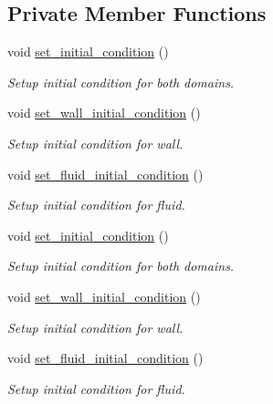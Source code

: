 \subsection*{Private Member Functions}
\begin{DoxyCompactItemize}
\item 
void \hyperlink{classFSIRingProblem_a309ea4c79fbae58020d94bf2c2318169}{set\+\_\+initial\+\_\+condition} ()
\begin{DoxyCompactList}\small\item\em Setup initial condition for both domains. \end{DoxyCompactList}\item 
void \hyperlink{classFSIRingProblem_a5f987c1b22dc306cf7d26be7fa74e322}{set\+\_\+wall\+\_\+initial\+\_\+condition} ()
\begin{DoxyCompactList}\small\item\em Setup initial condition for wall. \end{DoxyCompactList}\item 
void \hyperlink{classFSIRingProblem_ad397e4e3b92845240dd6a996856f33e7}{set\+\_\+fluid\+\_\+initial\+\_\+condition} ()
\begin{DoxyCompactList}\small\item\em Setup initial condition for fluid. \end{DoxyCompactList}\item 
void \hyperlink{classFSIRingProblem_a309ea4c79fbae58020d94bf2c2318169}{set\+\_\+initial\+\_\+condition} ()
\begin{DoxyCompactList}\small\item\em Setup initial condition for both domains. \end{DoxyCompactList}\item 
void \hyperlink{classFSIRingProblem_a5f987c1b22dc306cf7d26be7fa74e322}{set\+\_\+wall\+\_\+initial\+\_\+condition} ()
\begin{DoxyCompactList}\small\item\em Setup initial condition for wall. \end{DoxyCompactList}\item 
void \hyperlink{classFSIRingProblem_ad397e4e3b92845240dd6a996856f33e7}{set\+\_\+fluid\+\_\+initial\+\_\+condition} ()
\begin{DoxyCompactList}\small\item\em Setup initial condition for fluid. \end{DoxyCompactList}\end{DoxyCompactItemize}
